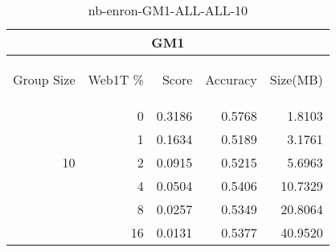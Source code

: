 \begin{center}
\begin{table}[htbp]
\begin{tabular}{ | r | r | r | r | r |}
\hline
\multicolumn{5}{|c|}{GM1}\\
\hline
\begin{sideways}Group Size\end{sideways} & \begin{sideways}Web1T \%\end{sideways} & \begin{sideways}Score\end{sideways} & \begin{sideways}Accuracy\end{sideways} & \begin{sideways}Size(MB)\end{sideways}\\
\hline
\multirow{5}{*}{10}
 & 0 & 0.3186 & 0.5768 & 1.8103\\ \cline{2-5}
 & 1 & 0.1634 & 0.5189 & 3.1761\\ \cline{2-5}
 & 2 & 0.0915 & 0.5215 & 5.6963\\ \cline{2-5}
 & 4 & 0.0504 & 0.5406 & 10.7329\\ \cline{2-5}
 & 8 & 0.0257 & 0.5349 & 20.8064\\ \cline{2-5}
 & 16 & 0.0131 & 0.5377 & 40.9520\\ \cline{2-5}
\hline
\end{tabular}
\caption{nb-enron-GM1-ALL-ALL-10}
\label{table:nb-enron-GM1-ALL-ALL-10}
\end{table}
\end{center}

